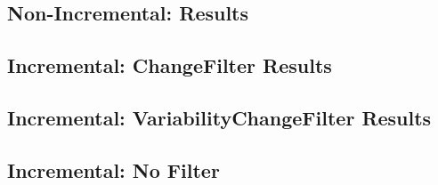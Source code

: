 \documentclass[a4paper]{article}
\begin{document}
\subsection{Non-Incremental: Results}

\subsection{Incremental: ChangeFilter Results}

\subsection{Incremental: VariabilityChangeFilter Results}

\subsection{Incremental: No Filter}


\newpage


\end{document}
